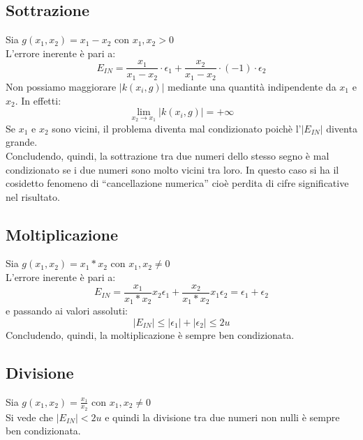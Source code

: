 \documentclass[12pt]{report}
\begin{document}
\subsection{Sottrazione}
Sia $g(x_1, x_2) = x_1 - x_2$ con $x_1, x_2 > 0$ \\
L'errore inerente è pari a:
\[
E_{IN} = \frac{x_1}{x_1 - x_2}\cdot \epsilon_1 + \frac{x_2}{x_1 - x_2}\cdot (-1) \cdot \epsilon_2
\]
Non possiamo maggiorare $|k(x_i, g)|$ mediante una quantità indipendente da $x_1$ e $x_2$. In effetti:
\[
\lim\limits_{x_2 \to x_1} |k(x_i, g)| = +\infty
\]
Se $x_1$ e $x_2$ sono vicini, il problema diventa mal condizionato poichè l'$|E_{IN}|$ diventa grande. \\
Concludendo, quindi, la sottrazione tra due numeri dello stesso segno è mal condizionato se i due numeri sono molto vicini tra loro. In questo caso si ha il cosidetto fenomeno di ``cancellazione numerica'' cioè perdita di cifre significative nel risultato.
\subsection{Moltiplicazione}
Sia $g(x_1, x_2) = x_1 * x_2$ con $x_1, x_2 \neq 0$ \\
L'errore inerente è pari a:
\[
E_{IN} = \frac{x_1}{x_1 * x_2}x_2 \epsilon_1 + \frac{x_2}{x_1 * x_2}x_1\epsilon_2 = \epsilon_1 + \epsilon_2
\]
e passando ai valori assoluti:
\[
|E_{IN}| \leq |\epsilon_1| + |\epsilon_2| \leq 2u
\]
Concludendo, quindi, la moltiplicazione è sempre ben condizionata.
\subsection{Divisione}
Sia $g(x_1, x_2) = \frac{x_1}{x_2}$ con $x_1, x_2 \neq 0$ \\
Si vede che $|E_{IN}| < 2u$ e quindi la divisione tra due numeri non nulli è sempre ben condizionata.
\end{document}
